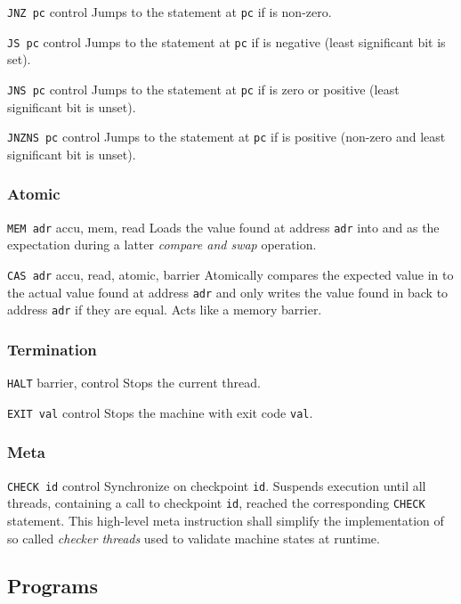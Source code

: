 {\texttt{JNZ pc}}
{control}
{Jumps to the statement at \texttt{pc} if \accu{} is non-zero.}

{\texttt{JS pc}}
{control}
{Jumps to the statement at \texttt{pc} if \accu{} is negative (least significant bit is set).}

{\texttt{JNS pc}}
{control}
{Jumps to the statement at \texttt{pc} if \accu{} is zero or positive (least significant bit is unset).}

{\texttt{JNZNS pc}}
{control}
{Jumps to the statement at \texttt{pc} if \accu{} is positive (non-zero and least significant bit is unset).}

\subsubsection{Atomic}

{\texttt{MEM adr}}
{accu, mem, read}
{Loads the value found at address \texttt{adr} into \accu{} and \mem{} as the expectation during a latter \emph{compare and swap} operation.}

{\texttt{CAS adr}}
{accu, read, atomic, barrier}
{Atomically compares the expected value in \mem{} to the actual value found at address \texttt{adr} and only writes the value found in \accu{} back to address \texttt{adr} if they are equal.
Acts like a memory barrier.}

\subsubsection{Termination}

{\texttt{HALT}}
{barrier, control}
{Stops the current thread.}

{\texttt{EXIT val}}
{control}
{Stops the machine with exit code \texttt{val}.}

\subsubsection{Meta}

{\texttt{CHECK id}}
{control}
{Synchronize on checkpoint \texttt{id}.
Suspends execution until all threads, containing a call to checkpoint \texttt{id}, reached the corresponding \texttt{CHECK} statement.
This high-level meta instruction shall simplify the implementation of so called \emph{checker threads} used to validate machine states at runtime.}

\subsection{Programs}

